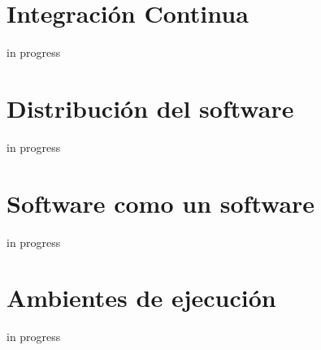 \section{Integración Continua}
\noindent in progress

\section{Distribución del software}
\noindent in progress

\section{Software como un software}
\noindent in progress

\section{Ambientes de ejecución}
\noindent in progress
